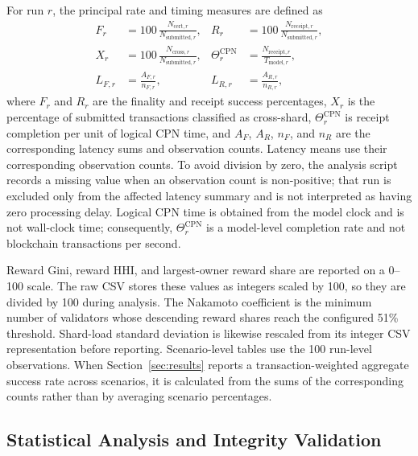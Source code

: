 \documentclass[a4paper,fleqn]{cas-sc}
\begin{document}
For run $r$, the principal rate and timing measures are defined as
\begin{align}
F_r & = 100\,\frac{N_{\mathrm{cert},r}}{N_{\mathrm{submitted},r}},
&
R_r & = 100\,\frac{N_{\mathrm{receipt},r}}{N_{\mathrm{submitted},r}},
\label{eq:success_rates}\\
X_r & = 100\,\frac{N_{\mathrm{cross},r}}{N_{\mathrm{submitted},r}},
&
\Theta_r^{\mathrm{CPN}} & =
\frac{N_{\mathrm{receipt},r}}{T_{\mathrm{model},r}},
\label{eq:stress_throughput}\\
L_{F,r} & =
\frac{A_{F,r}}{n_{F,r}},
&
L_{R,r} & =
\frac{A_{R,r}}{n_{R,r}},
\label{eq:latency_measures}
\end{align}
where $F_r$ and $R_r$ are the finality and receipt success percentages,
$X_r$ is the percentage of submitted transactions classified as cross-shard,
$\Theta_r^{\mathrm{CPN}}$ is receipt completion per unit of logical CPN time,
and $A_F$, $A_R$, $n_F$, and $n_R$ are the corresponding latency sums and
observation counts. Latency means use their corresponding observation counts. To avoid division
by zero, the analysis script records a missing value when an observation count is
non-positive; that run is excluded only from the affected latency summary and is
not interpreted as having zero processing delay. Logical CPN time is obtained from the
model clock and is not wall-clock time; consequently,
$\Theta_r^{\mathrm{CPN}}$ is a model-level completion rate and not blockchain
transactions per second.

Reward Gini, reward HHI, and largest-owner reward share are reported on a
0--100 scale. The raw CSV stores these values as integers scaled by 100, so they
are divided by 100 during analysis. The Nakamoto coefficient is the minimum
number of validators whose descending reward shares reach the configured 51\%
threshold. Shard-load standard deviation is likewise rescaled from its integer
CSV representation before reporting. Scenario-level tables use the 100 run-level
observations. When Section~\ref{sec:results} reports a transaction-weighted
aggregate success rate across scenarios, it is calculated from the sums of the
corresponding counts rather than by averaging scenario percentages.

\subsection{Statistical Analysis and Integrity Validation}
\label{subsec:data_collection}
\end{document}
